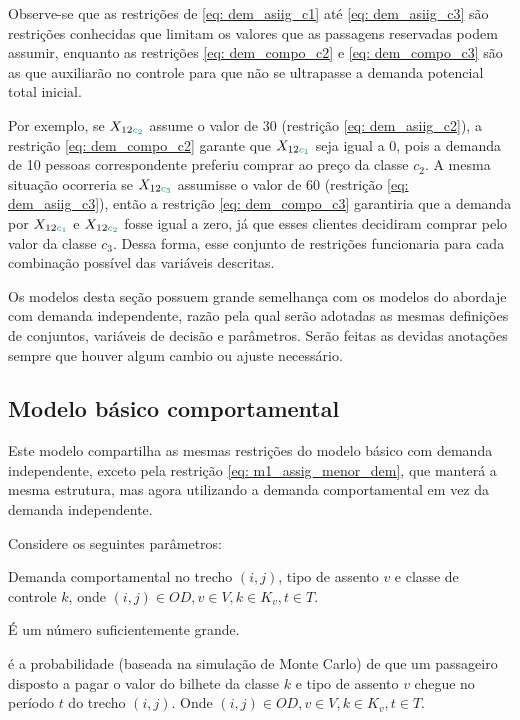 Observe-se que as restrições de \ref{eq: dem_asiig_c1} até \ref{eq: dem_asiig_c3} são restrições conhecidas que limitam os valores que as passagens reservadas podem assumir, enquanto as restrições \ref{eq: dem_compo_c2} e \ref{eq: dem_compo_c3} são as que auxiliarão no controle para que não se ultrapasse a demanda potencial total inicial.

Por exemplo, se $X_{12\textcolor[rgb]{0.0588, 0.5412, 0.4275}{c_2}}$ assume o valor de 30 (restrição \ref{eq: dem_asiig_c2}), a restrição \ref{eq: dem_compo_c2} garante que $X_{12\textcolor[rgb]{0.0588, 0.5412, 0.4275}{c_1}}$ seja igual a 0, pois a demanda de 10 pessoas correspondente preferiu comprar ao preço da classe $c_2$. A mesma situação ocorreria se $X_{12\textcolor[rgb]{0.0588, 0.5412, 0.4275}{c_3}}$ assumisse o valor de 60 (restrição \ref{eq: dem_asiig_c3}), então a restrição \ref{eq: dem_compo_c3} garantiria que a demanda por $X_{12\textcolor[rgb]{0.0588, 0.5412, 0.4275}{c_1}}$ e $X_{12\textcolor[rgb]{0.0588, 0.5412, 0.4275}{c_2}}$ fosse igual a zero, já que esses clientes decidiram comprar pelo valor da classe $c_3$. Dessa forma, esse conjunto de restrições funcionaria para cada combinação possível das variáveis descritas.

Os modelos desta seção possuem grande semelhança com os modelos do abordaje com demanda independente, razão pela qual serão adotadas as mesmas definições de conjuntos, variáveis de decisão e parâmetros. Serão feitas as devidas anotações sempre que houver algum cambio ou ajuste necessário.

\subsection{Modelo básico comportamental} 
Este modelo compartilha as mesmas restrições do modelo básico com demanda independente, exceto pela restrição \eqref{eq: m1_assig_menor_dem}, que manterá a mesma estrutura, mas agora utilizando a demanda comportamental em vez da demanda independente.

Considere os seguintes parâmetros:
\begin{description}[style=unboxed, leftmargin=2.5cm, labelindent=1.5cm]
	\setlength{\itemsep}{-2.2em} %
	\setlength{\parskip}{0em} %
	\item[$d'_{ijvkt}:$] Demanda comportamental no trecho $(i,j)$, tipo de assento $v$ e classe de controle $k$, onde $(i,j) \in OD,v \in V, k \in K_v, t \in T$.\\
	\item[$M:$] É um número suficientemente grande.\\
	\item[$\sigma_{ijvkt}:$] é a probabilidade (baseada na simulação de Monte Carlo) de que um passageiro disposto a pagar o valor do bilhete da classe $k$ e tipo de assento $v$ chegue no período $t$ do trecho $(i,j)$. Onde $(i,j) \in OD,v \in V, k \in K_v, t \in T$.
\end{description}

